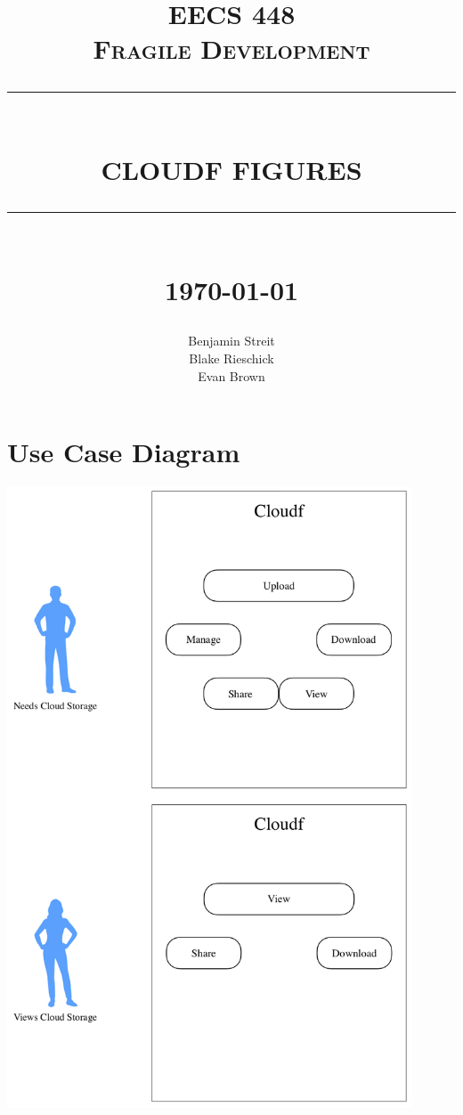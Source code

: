 \documentclass[12pt]{report}
\newcommand{\HRule}[1]{\rule{\linewidth}{#1}}
\begin{document}
\title{ \normalsize \textsc{EECS 448 \\ Fragile Development}
        \HRule{0.5pt} \\
        \LARGE \textbf{\uppercase{cloudf Figures}}
        \HRule{2pt} \\ [0.5cm]
        \normalsize \today \vspace*{5\baselineskip}}

\date{}

\author{
        Benjamin Streit \\ 
        Blake Rieschick \\
        Evan Brown }

\maketitle
\newpage

%
%
\sectionfont{\scshape}

%
%

%
%
\section*{Use Case Diagram}
\begin{center}
    \includegraphics[width=0.90\textwidth]{images/use_case_diagram.png}
\end{center}
\end{document}
